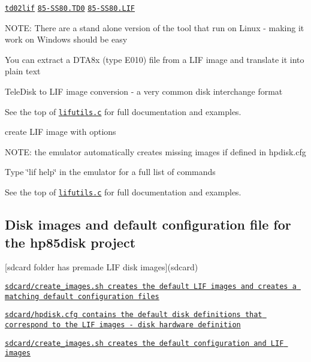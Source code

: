 \begin{DoxyItemize}
\item \href{lif/t202lif}{\tt td02lif} \href{lif/85-SS80.TD0}{\tt 85-\/\+S\+S80.\+T\+D0} \href{lif/85-SS80.LIF}{\tt 85-\/\+S\+S80.\+L\+IF}
\item N\+O\+TE\+: There are a stand alone version of the tool that run on Linux -\/ making it work on Windows should be easy
\begin{DoxyItemize}
\item You can extract a D\+T\+A8x (type E010) file from a L\+IF image and translate it into plain text
\end{DoxyItemize}
\item Tele\+Disk to L\+IF image conversion -\/ a very common disk interchange format
\begin{DoxyItemize}
\item See the top of \href{lif/lifutils.c}{\tt lifutils.\+c} for full documentation and examples.
\item create L\+IF image with options
\item N\+O\+TE\+: the emulator automatically creates missing images if defined in hpdisk.\+cfg
\begin{DoxyItemize}
\item Type \char`\"{}lif help\char`\"{} in the emulator for a full list of commands
\item See the top of \href{lif/lifutils.c}{\tt lifutils.\+c} for full documentation and examples.
\end{DoxyItemize}
\end{DoxyItemize}
\end{DoxyItemize}

\subsection*{Disk images and default configuration file for the hp85disk project}


\begin{DoxyItemize}
\item \mbox{[}sdcard folder has premade L\+IF disk images\mbox{]}(sdcard)
\begin{DoxyItemize}
\item \href{sdcard/create_images}{\tt sdcard/create\+\_\+images.\+sh creates the default L\+IF images and creates a matching default configuration files}
\end{DoxyItemize}
\item \href{sdcard/hpdisk.cfg}{\tt sdcard/hpdisk.\+cfg contains the default disk definitions that correspond to the L\+IF images -\/ disk hardware definition}
\begin{DoxyItemize}
\item \href{sdcard/create_images}{\tt sdcard/create\+\_\+images.\+sh creates the default configuration and L\+IF images}
\end{DoxyItemize}
\end{DoxyItemize}

